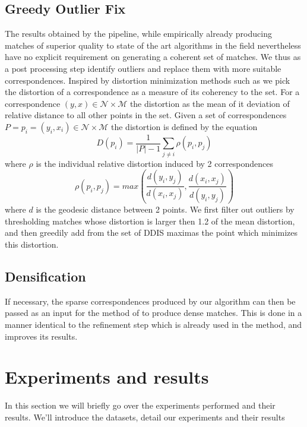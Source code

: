 \documentclass[10pt,twocolumn,letterpaper]{article}
\begin{document}
\subsection{Greedy Outlier Fix}
The results obtained by the pipeline, while empirically already producing matches of superior quality to state of the art algorithms in the field nevertheless have no explicit requirement on generating a coherent set of matches. We thus as a post processing step identify outliers and replace them with more suitable correspondences. 
Inspired by distortion minimization methods such as\cite{sahillioǧlu2011coarse} we pick the distortion of a correspondence as a measure of its coherency to the set. For a correspondence $(y,x)\in \mathcal{N}\times\mathcal{M}$ the distortion as the mean of it deviation of relative distance to all other points in the set. Given a set of correspondences $P={p_i=(y_i,x_i)\in \mathcal{N}\times\mathcal{M}}$ the distortion is defined by the equation
\begin{equation}
	D(p_i) = \frac{1}{|P|-1}\sum_{j \neq i}{\rho(p_i,p_j)}
\end{equation}
where $\rho$ is the individual relative distortion induced by 2 correspondences
\begin{equation}
\rho(p_i,p_j) = max(\frac{d(y_i,y_j)}{d(x_i,x_j)},\frac{d(x_i,x_j)}{d(y_i,y_j)})
\end{equation}
where $d$ is the geodesic distance between 2 points.
We first filter out outliers by thresholding matches whose distortion is larger then 1.2 of the mean distortion, and then greedily add from the set of DDIS maximas the point which minimizes this distortion.
\subsection{Densification}
If necessary, the sparse correspondences produced by our algorithm can then be passed as an input for the method of \cite{litany2017fully} to produce dense matches. This is done in a manner identical to the refinement step which is already used in the method, and improves its results.
\section{Experiments and results}\label{section:results}

In this section we will briefly go over the experiments performed and their results. We'll introduce the datasets, detail our experiments and their results
\end{document}
